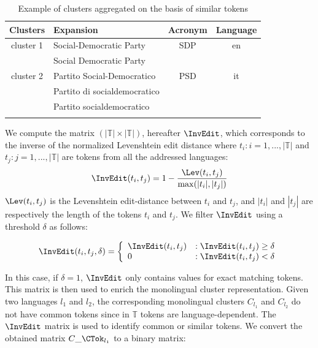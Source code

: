 \documentclass[output=paper]{langsci/langscibook}
\begin{document}
\begin{table}[h]
\centering
\begin{tabular}{clcc}\lsptoprule
Clusters    &  Expansion  & Acronym  &  Language \\
\midrule
cluster 1  &  Social-Democratic Party      &  SDP  & en  \\
                   &  Social Democratic Party      &      &     \\ \midrule
cluster 2  &  Partito Social-Democratico   &  PSD  & it \\
                   &  Partito di socialdemocratico &      &    \\
                   &  Partito socialdemocratico   &       &    \\ 
\lspbottomrule
\end{tabular}
\caption{Example of clusters aggregated on the basis of similar tokens}
\label{jac:tab:common token aggregation}
\end{table}


We compute the matrix $(|\mathbb{T}| \times |\mathbb{T}|)$, hereafter
$\InvEdit$, which corresponds to the inverse of the normalized
Levenshtein edit distance where $t_i : i = 1,...,|\mathbb{T}|$ and
$t_j : j = 1,...,|\mathbb{T}|$ are tokens from all the addressed
languages:
\begin{equation}\label{jac:eq:edit}
\InvEdit(t_i,t_j) = 1 - \frac{\Lev(t_i,t_j)}{\max(|t_i|,|t_j|)} 
\end{equation}
$\Lev(t_i,t_j)$ is the Levenshtein edit-distance between $t_i$ and $t_j$, 
and $|t_i|$ and $|t_j|$ are respectively the length of the tokens $t_i$ 
and $t_j$. We filter $\InvEdit$ using a threshold $\delta$ as follows:

\begin{equation}
\InvEdit(t_i,t_j,\delta) =
\left\{
  \begin{array}{lr}
    \InvEdit(t_i,t_j) & : \InvEdit(t_i,t_j) \ge \delta\\
    0 & : \InvEdit(t_i,t_j) < \delta
  \end{array}
\right.
\end{equation}

In this case, if $\delta = 1$, $\InvEdit$ only contains values for
exact matching tokens.
This matrix is then used to enrich the monolingual cluster
representation.  Given two languages $l_{1}$ and $l_{2}$, the
corresponding monolingual clusters $C_{l_{1}}$ and $C_{l_{2}}$ do not
have common tokens since in $\mathbb{T}$ tokens are
language-dependent. The $\InvEdit$ matrix is used to identify common or
similar tokens. We convert the obtained matrix $C\_\CTok_{l_{1}}$ to a
binary matrix:
\end{document}
